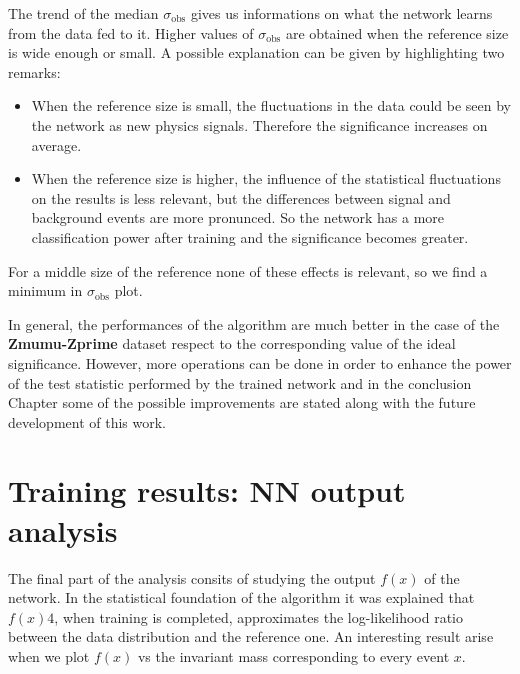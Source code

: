 The trend of the median $\sigma_\mathrm{obs}$ gives us informations on what the network learns from the data fed to it. Higher values of $\sigma_\mathrm{obs}$ are obtained when the reference size is wide enough or small. A possible explanation can be given by highlighting two remarks:
\begin{itemize}
	\item When the reference size is small, the fluctuations in the data could be seen by the network as new physics signals. Therefore the significance increases on average.
	\item When the reference size is higher, the influence of the statistical fluctuations on the results is less relevant, but the differences between signal and background events are more pronunced. So the network has a more classification power after training and the significance becomes greater.
\end{itemize}
For a middle size of the reference none of these effects is relevant, so we find a minimum in $\sigma_\mathrm{obs}$ plot.

In general, the performances of the algorithm are much better in the case of the \textbf{Zmumu-Zprime} dataset respect to the corresponding value of the ideal significance. However, more operations can be done in order to enhance the power of the test statistic performed by the trained network and in the conclusion Chapter some of the possible improvements are stated along with the future development of this work.





\section{Training results: NN output analysis}
The final part of the analysis consits of studying the output $f(x)$ of the network. In the statistical foundation of the algorithm it was explained that $f(x)4$, when training is completed, approximates the log-likelihood ratio between the data distribution and the reference one. An interesting result arise when we plot $f(x)$ vs the invariant mass corresponding to every event $x$.

